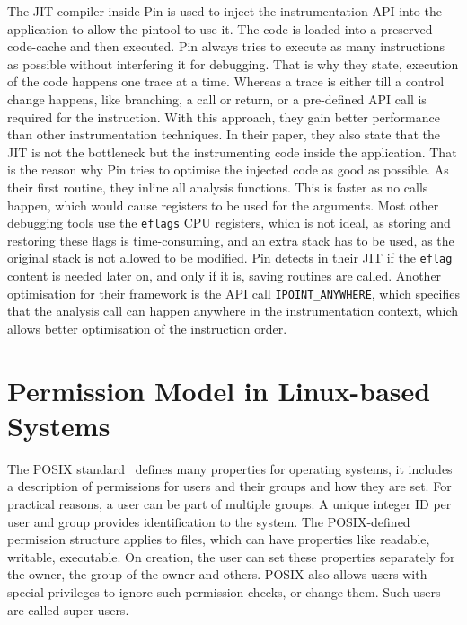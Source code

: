 The JIT compiler inside Pin is used to inject the instrumentation API into the
application to allow the pintool to use it. The code is loaded into a preserved
code-cache and then executed. Pin always tries to execute as many instructions
as possible without interfering it for debugging. That is why they state,
execution of the code happens one trace at a time. Whereas a trace is either
till a control change happens, like branching, a call or return, or a
pre-defined API call is required for the instruction. With this approach, they
gain better performance than other instrumentation techniques. In their paper,
they also state that the JIT is not the bottleneck but the instrumenting code
inside the application. That is the reason why Pin tries to optimise the
injected code as good as possible. As their first routine, they inline all
analysis functions. This is faster as no calls happen, which would cause
registers to be used for the arguments. Most other debugging tools use the
\texttt{eflags} CPU registers, which is not ideal, as storing and restoring
these flags is time-consuming, and an extra stack has to be used, as the
original stack is not allowed to be modified. Pin detects in their JIT if the
\texttt{eflag} content is needed later on, and only if it is, saving routines
are called. Another optimisation for their framework is the API call
\texttt{IPOINT\_ANYWHERE}, which specifies that the analysis call can happen
anywhere in the instrumentation context, which allows better optimisation of the
instruction order.

\section{Permission Model in Linux-based Systems}

The POSIX standard~\cite{posix} defines many properties for operating systems,
it includes a description of permissions for users and their groups and how
they are set. For practical reasons, a user can be part of multiple groups. A
unique integer ID per user and group provides identification to the system. The
POSIX-defined permission structure applies to files, which can have properties
like readable, writable, executable. On creation, the user can set these
properties separately for the owner, the group of the owner and others. POSIX
also allows users with special privileges to ignore such permission checks, or
change them. Such users are called super-users.

